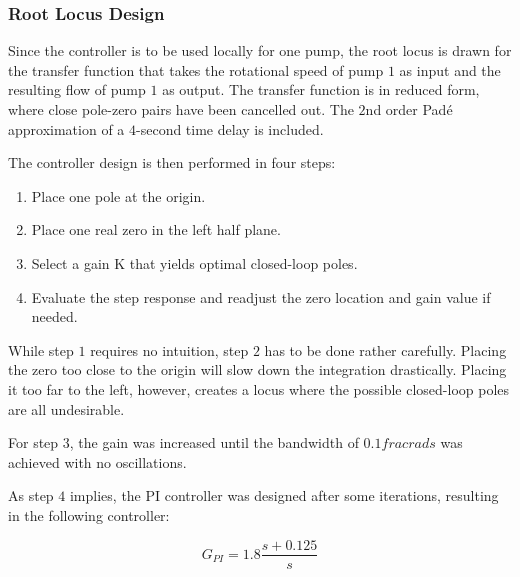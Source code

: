 \subsubsection{Root Locus Design}
Since the controller is to be used locally for one pump, the root locus is drawn for the transfer function that takes the rotational speed of pump $1$ as input and the resulting flow of pump $1$ as output. The transfer function is in reduced form, where close pole-zero pairs have been cancelled out. The $2$nd order Padé approximation of a $4$-second time delay is included.


The controller design is then performed in four steps:
\begin{enumerate}
	\item Place one pole at the origin.
	\item Place one real zero in the left half plane.
	\item Select a gain K that yields optimal closed-loop poles.
	\item Evaluate the step response and readjust the zero location and gain value if needed.
\end{enumerate}

While step $1$ requires no intuition, step $2$ has to be done rather carefully. Placing the zero too close to the origin will slow down the integration drastically. Placing it too far to the left, however, creates a locus where the possible closed-loop poles are all undesirable.

For step $3$, the gain was increased until the bandwidth of $0.1 \si{frac{rad}{s}}$ was achieved with no oscillations. 

As step $4$ implies, the PI controller was designed after some iterations, resulting in the following controller:

 \begin{equation}\label{eq:PITransferFunction}
	G_{PI} = 1.8 \frac{s+0.125}{s}
\end{equation}

